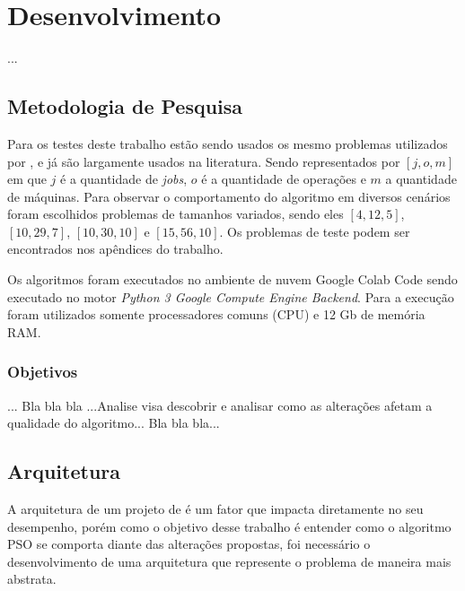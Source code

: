 
\chapter{Desenvolvimento}
        ...


\section{Metodologia de Pesquisa}
        Para os testes deste trabalho estão sendo usados os mesmo problemas utilizados por \cite{Kacem2002}, e já são largamente usados na literatura. Sendo representados por $[j, o, m]$ em que $j$ é a quantidade de \textit{jobs}, $o$ é a quantidade de operações e $m$ a quantidade de máquinas. Para observar o comportamento do algoritmo em diversos cenários foram escolhidos problemas de tamanhos variados, sendo eles $[4, 12, 5]$, $[10, 29, 7]$, $[10, 30, 10]$ e $[15, 56, 10]$. Os problemas de teste podem ser encontrados nos apêndices do trabalho.\newline

        Os algoritmos foram executados no ambiente de nuvem Google Colab Code sendo executado no motor \textit{Python 3 Google Compute Engine Backend}. Para a execução foram utilizados somente processadores comuns (CPU) e 12 Gb de memória RAM.

    \subsection{Objetivos}
        ... Bla bla bla ...Analise visa descobrir e analisar como as alterações afetam a qualidade do algoritmo... Bla bla bla...


\section{Arquitetura}
        A arquitetura de um projeto de é um fator que impacta diretamente no seu desempenho, porém como o objetivo desse trabalho é entender como o algoritmo PSO se comporta diante das alterações propostas, foi necessário o desenvolvimento de uma arquitetura que represente o problema de maneira mais abstrata.

